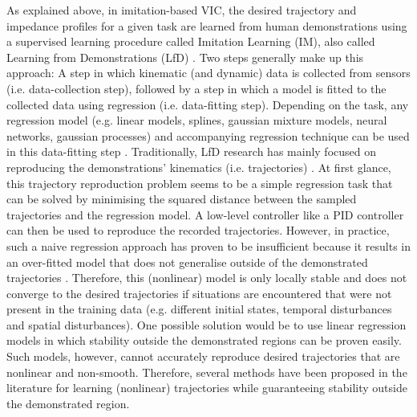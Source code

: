 As explained above, in imitation-based VIC, the desired trajectory and impedance profiles for a given task are learned from human demonstrations using a supervised learning procedure called Imitation Learning (IM), also called Learning from Demonstrations (LfD) \cite{ravichandarRecentAdvancesRobot2020}. Two steps generally make up this approach: A step in which kinematic (and dynamic) data is collected from sensors (i.e. data-collection step), followed by a step in which a model is fitted to the collected data using regression (i.e. data-fitting step). Depending on the task, any regression model (e.g. linear models, splines, gaussian mixture models, neural networks, gaussian processes) and accompanying regression technique can be used in this data-fitting step \cite{kroemerReviewRobotLearning2021,husseinImitationLearningSurvey2017}. Traditionally, LfD research has mainly focused on reproducing the demonstrations' kinematics (i.e. trajectories) \cite{siReviewManipulationSkill2021}. At first glance, this trajectory reproduction problem seems to be a simple regression task that can be solved by minimising the squared distance between the sampled trajectories and the regression model. A low-level controller like a PID controller can then be used to reproduce the recorded trajectories. However, in practice, such a naive regression approach has proven to be insufficient because it results in an over-fitted model that does not generalise outside of the demonstrated trajectories \cite{sindhwaniLearningContractingVector2018}. Therefore, this (nonlinear) model is only locally stable and does not converge to the desired trajectories if situations are encountered that were not present in the training data (e.g. different initial states, temporal disturbances and spatial disturbances). One possible solution would be to use linear regression models in which stability outside the demonstrated regions can be proven easily. Such models, however, cannot accurately reproduce desired trajectories that are nonlinear and non-smooth. Therefore, several methods have been proposed in the literature for learning (nonlinear) trajectories while guaranteeing stability outside the demonstrated region.

